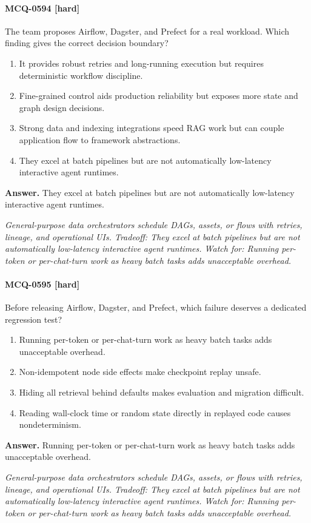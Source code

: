 \paragraph{MCQ-0594 [hard]} The team proposes Airflow, Dagster, and Prefect for a real workload. Which finding gives the correct decision boundary?
\begin{enumerate}[label=\Alph*.]
\item It provides robust retries and long-running execution but requires deterministic workflow discipline.
\item Fine-grained control aids production reliability but exposes more state and graph design decisions.
\item Strong data and indexing integrations speed RAG work but can couple application flow to framework abstractions.
\item They excel at batch pipelines but are not automatically low-latency interactive agent runtimes.
\end{enumerate}
\noindent\textbf{Answer.} They excel at batch pipelines but are not automatically low-latency interactive agent runtimes.
\par\textit{General-purpose data orchestrators schedule DAGs, assets, or flows with retries, lineage, and operational UIs. Tradeoff: They excel at batch pipelines but are not automatically low-latency interactive agent runtimes. Watch for: Running per-token or per-chat-turn work as heavy batch tasks adds unacceptable overhead.}
\paragraph{MCQ-0595 [hard]} Before releasing Airflow, Dagster, and Prefect, which failure deserves a dedicated regression test?
\begin{enumerate}[label=\Alph*.]
\item Running per-token or per-chat-turn work as heavy batch tasks adds unacceptable overhead.
\item Non-idempotent node side effects make checkpoint replay unsafe.
\item Hiding all retrieval behind defaults makes evaluation and migration difficult.
\item Reading wall-clock time or random state directly in replayed code causes nondeterminism.
\end{enumerate}
\noindent\textbf{Answer.} Running per-token or per-chat-turn work as heavy batch tasks adds unacceptable overhead.
\par\textit{General-purpose data orchestrators schedule DAGs, assets, or flows with retries, lineage, and operational UIs. Tradeoff: They excel at batch pipelines but are not automatically low-latency interactive agent runtimes. Watch for: Running per-token or per-chat-turn work as heavy batch tasks adds unacceptable overhead.}
